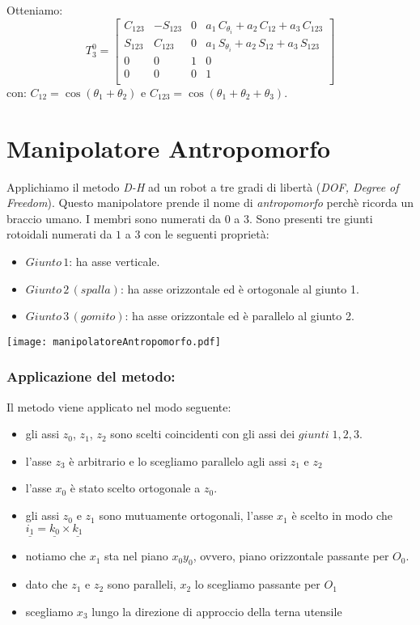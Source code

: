 Otteniamo:
\begin{equation}
	T_3^0 = 
	\begin{bmatrix}
		C_{123} & -S_{123} & 0 & a_1\,C_{\theta_i}+a_2\,C_{12}+ a_3\,C_{123} \\
		S_{123} & C_{123} & 0 & a_1\,S_{\theta_i}+a_2\,S_{12}+ a_3\,S_{123} \\
		0 & 0 & 1 & 0 \\
		0 & 0 & 0 & 1 \\
	\end{bmatrix}
\end{equation}
con: $C_{12} = \cos(\theta_1 + \theta_2)$ e $C_{123} = \cos(\theta_1 + \theta_2 + \theta_3)$.

\section{Manipolatore Antropomorfo}
Applichiamo il metodo \emph{D-H} ad un robot a tre gradi di libertà (\emph{DOF, Degree of Freedom}). Questo manipolatore prende il nome di \emph{antropomorfo} perchè ricorda un braccio umano. I membri sono numerati da $0$ a $3$. Sono presenti tre giunti rotoidali numerati da $1$ a $3$ con le seguenti proprietà:
\begin{itemize}
	\item $Giunto\, 1$: ha asse verticale.
	\item $Giunto\, 2 \,(spalla)$: ha asse orizzontale ed è ortogonale al giunto 1.
	\item $Giunto\, 3 \, (gomito)$: ha asse orizzontale ed è parallelo al giunto 2.
\end{itemize}

\begin{center}
\texttt{[image: manipolatoreAntropomorfo.pdf]}
\end{center}

\subsubsection{Applicazione del metodo:}
Il metodo viene applicato nel modo seguente:
\begin{itemize}
	\item gli assi $z_0$, $z_1$, $z_2$ sono scelti coincidenti con gli assi dei $giunti \; 1,2,3$.
	\item l'asse $z_3$ è arbitrario e lo scegliamo parallelo agli assi $z_1$ e $z_2$
	\item l'asse $x_0$ è stato scelto ortogonale a $z_0$.
	\item gli assi $z_0$ e $z_1$ sono mutuamente ortogonali, l'asse $x_1$ è scelto in modo che $\underline{i_1} = \underline{k_0} \times \underline{k_1}$
	\item notiamo che $x_1$ sta nel piano $x_0y_0$, ovvero, piano orizzontale passante per $O_0$.
	\item dato che $z_1$ e $z_2$ sono paralleli, $x_2$ lo scegliamo passante per $O_1$
	\item scegliamo $x_3$ lungo la direzione di approccio della terna utensile
\end{itemize}


